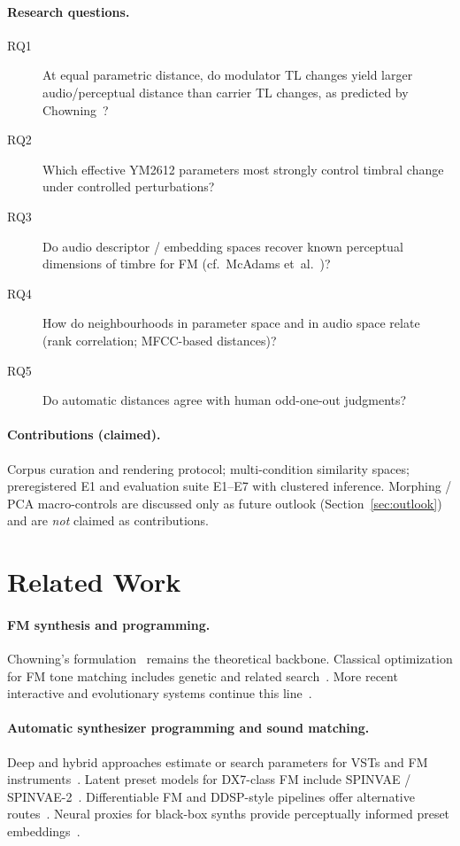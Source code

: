 \documentclass{article}
\begin{document}
\paragraph{Research questions.}
\begin{description}
  \item[RQ1] At equal parametric distance, do modulator TL changes yield larger
    audio/perceptual distance than carrier TL changes, as predicted by
    Chowning~\cite{chowning1973}?
  \item[RQ2] Which effective YM2612 parameters most strongly control timbral
    change under controlled perturbations?
  \item[RQ3] Do audio descriptor / embedding spaces recover known perceptual
    dimensions of timbre for FM (cf.\ McAdams et~al.~\cite{mcadams1995})?
  \item[RQ4] How do neighbourhoods in parameter space and in audio space
    relate (rank correlation; MFCC-based distances)?
  \item[RQ5] Do automatic distances agree with human odd-one-out judgments?
\end{description}

\paragraph{Contributions (claimed).}
Corpus curation and rendering protocol; multi-condition similarity spaces;
preregistered E1 and evaluation suite E1--E7 with clustered inference.
Morphing / PCA macro-controls are discussed only as future outlook
(Section~\ref{sec:outlook}) and are \emph{not} claimed as contributions.

\section{Related Work}
\label{sec:related}

\paragraph{FM synthesis and programming.}
Chowning's formulation~\cite{chowning1973} remains the theoretical backbone.
Classical optimization for FM tone matching includes genetic and related
search~\citep{horner1993,dahlstedt2001,dahlstedt2007}.
More recent interactive and evolutionary systems continue this
line~\citep{krekovic2019}.

\paragraph{Automatic synthesizer programming and sound matching.}
Deep and hybrid approaches estimate or search parameters for VSTs and FM
instruments~\citep{yeeking2018,chen2022sound2synth,yang2023whitebox,masuda2023,roma2024}.
Latent preset models for DX7-class FM include SPINVAE /
SPINVAE-2~\citep{levaillant2020nime,levaillant2021dafx,levaillant2024spinvae2}.
Differentiable FM and DDSP-style pipelines offer alternative
routes~\citep{caspe2022ddx7,hayes2024ddsp}.
Neural proxies for black-box synths provide perceptually informed preset
embeddings~\citep{combes2025jaes}.
\end{document}
